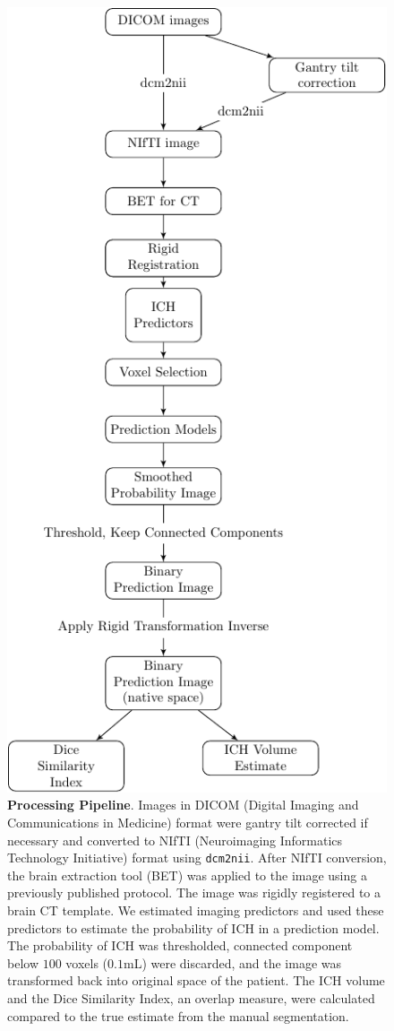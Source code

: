 \documentclass{elsarticle_nonatbib}\usepackage[]{graphicx}\usepackage[]{color}
\begin{document}


\begin{figure}
\centering
\includegraphics[width=0.5\linewidth]{Imaging_Pipeline_Flowchart_with_Rigid.pdf}
\caption{{\bf Processing Pipeline}.  Images in DICOM (Digital Imaging and Communications in Medicine) format were gantry tilt corrected if necessary and converted to NIfTI (Neuroimaging Informatics Technology Initiative) format using \texttt{dcm2nii}.  After NIfTI conversion, the brain extraction tool (BET) was applied to the image using a previously published protocol.  The image was rigidly registered to a brain CT template.  We estimated imaging predictors and used these predictors to estimate the probability of ICH in a prediction model.  The probability of ICH was thresholded, connected component below $100$ voxels ($0.1$mL) were discarded, and the image was transformed back into original space of the patient.  The ICH volume and the Dice Similarity Index, an overlap measure, were calculated compared to the true estimate from the manual segmentation.  }
\label{fig:framework}
\end{figure}
\end{document}
